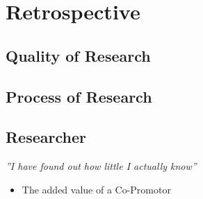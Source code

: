 \chapter{Retrospective}
\label{ch:retrospective}

\section{Quality of Research}

\section{Process of Research}

\section{Researcher}

\begin{center}
\textit{''I have found out how little I actually know''}
\end{center}

\begin{itemize}
	\item{The added value of a Co-Promotor}
\end{itemize}